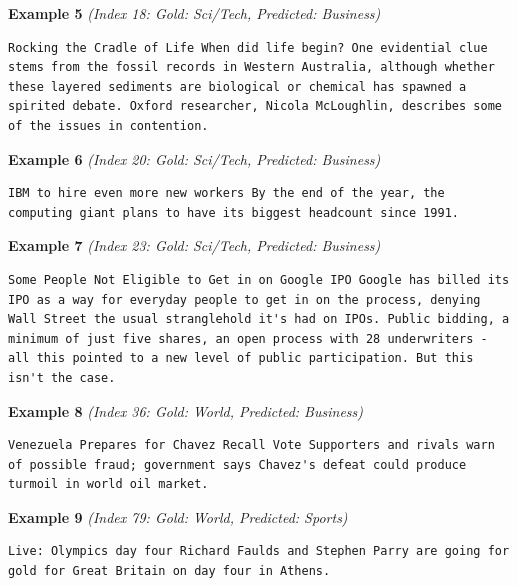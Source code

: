 \noindent
\textbf{Example 5} \quad \textit{(Index 18: Gold: Sci/Tech, Predicted: Business)}

\begin{Verbatim}[breaklines=true,breakanywhere=true,fontsize=\small]
Rocking the Cradle of Life When did life begin? One evidential clue stems from the fossil records in Western Australia, although whether these layered sediments are biological or chemical has spawned a spirited debate. Oxford researcher, Nicola McLoughlin, describes some of the issues in contention.
\end{Verbatim}

\noindent
\textbf{Example 6} \quad \textit{(Index 20: Gold: Sci/Tech, Predicted: Business)}

\begin{Verbatim}[breaklines=true,breakanywhere=true,fontsize=\small]
IBM to hire even more new workers By the end of the year, the computing giant plans to have its biggest headcount since 1991.
\end{Verbatim}

\noindent
\textbf{Example 7} \quad \textit{(Index 23: Gold: Sci/Tech, Predicted: Business)}

\begin{Verbatim}[breaklines=true,breakanywhere=true,fontsize=\small]
Some People Not Eligible to Get in on Google IPO Google has billed its IPO as a way for everyday people to get in on the process, denying Wall Street the usual stranglehold it's had on IPOs. Public bidding, a minimum of just five shares, an open process with 28 underwriters - all this pointed to a new level of public participation. But this isn't the case.
\end{Verbatim}

\noindent
\textbf{Example 8} \quad \textit{(Index 36: Gold: World, Predicted: Business)}

\begin{Verbatim}[breaklines=true,breakanywhere=true,fontsize=\small]
Venezuela Prepares for Chavez Recall Vote Supporters and rivals warn of possible fraud; government says Chavez's defeat could produce turmoil in world oil market.
\end{Verbatim}

\noindent
\textbf{Example 9} \quad \textit{(Index 79: Gold: World, Predicted: Sports)}

\begin{Verbatim}[breaklines=true,breakanywhere=true,fontsize=\small]
Live: Olympics day four Richard Faulds and Stephen Parry are going for gold for Great Britain on day four in Athens.
\end{Verbatim}

